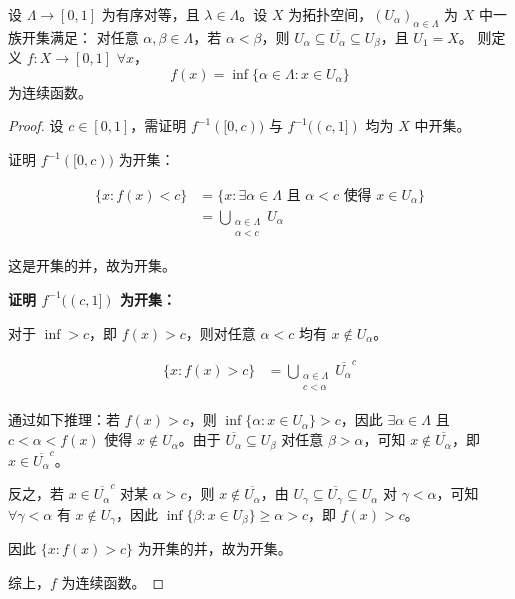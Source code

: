 \documentclass[lang=cn,a4paper,newtx,figureplace=section,tableplace=section]{elegantbook}
\begin{document}
\begin{lemma}\label{lem:urysohn-construction}
设 $\Lambda \to [0,1]$ 为有序对等，且 $\lambda \in \Lambda$。设 $X$ 为拓扑空间，$(U_\alpha)_{\alpha \in \Lambda}$ 为 $X$ 中一族开集满足： 对任意 $\alpha, \beta \in \Lambda$，若 $\alpha < \beta$，则 $U_\alpha \subseteq \overline{U_\alpha} \subseteq U_\beta$，且 $U_1 = X$。
则定义 $f: X \to [0,1]$  $\forall x$，
\begin{equation}
f(x) = \inf\{\alpha \in \Lambda : x \in U_\alpha\}
\end{equation}
为连续函数。
\end{lemma}
\begin{proof}
设 $c \in [0,1]$，需证明 $f^{-1}([0,c))$ 与 $f^{-1}((c,1])$ 均为 $X$ 中开集。

$\textbf{证明 $f^{-1}([0,c))$ 为开集：}$

\begin{align}
\{x : f(x) < c\} &= \{x : \exists \alpha \in \Lambda \text{ 且 } \alpha < c \text{ 使得 } x \in U_\alpha\} \\
&= \bigcup_{\substack{\alpha \in \Lambda \\ \alpha < c}} U_\alpha
\end{align}

这是开集的并，故为开集。

\textbf{证明 $f^{-1}((c,1])$ 为开集：}

对于 $\inf > c$，即 $f(x) > c$，则对任意 $\alpha < c$ 均有 $x \notin U_\alpha$。

\begin{align}
\{x : f(x) > c\} &= \bigcup_{\substack{\alpha \in \Lambda \\ c < \alpha}} \overline{U_\alpha}^c
\end{align}

通过如下推理：若 $f(x) > c$，则 $\inf\{\alpha : x \in U_\alpha\} > c$，因此 $\exists \alpha \in \Lambda$ 且 $c < \alpha < f(x)$ 使得 $x \notin U_\alpha$。由于 $\overline{U_\alpha} \subseteq U_\beta$ 对任意 $\beta > \alpha$，可知 $x \notin \overline{U_\alpha}$，即 $x \in \overline{U_\alpha}^c$。

反之，若 $x \in \overline{U_\alpha}^c$ 对某 $\alpha > c$，则 $x \notin \overline{U_\alpha}$，由 $U_\gamma \subseteq \overline{U_\gamma} \subseteq U_\alpha$ 对 $\gamma < \alpha$，可知 $\forall \gamma < \alpha$ 有 $x \notin U_\gamma$，因此 $\inf\{\beta : x \in U_\beta\} \geq \alpha > c$，即 $f(x) > c$。

因此 $\{x : f(x) > c\}$ 为开集的并，故为开集。

综上，$f$ 为连续函数。
\end{proof}
\end{document}
